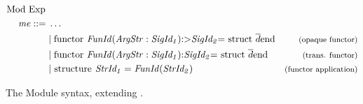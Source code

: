 \begin{figure}[H]
\begin{align*}
\begin{aligned}
%
\text{Mod Exp }\\
\mathit{me} ::= \; & \ldots\\
&|\; \text{\lsttext{functor $\ \cmath{FunId}$($\cmath{ArgStr:SigId_{1}}$):>$\cmath{SigId_{2}}$ = struct $\ \overline{d}$ end}} & \expl{(opaque functor)}\\
&|\; \text{\lsttext{functor $\ \cmath{FunId}$($\cmath{ArgStr:SigId_{1}}$):$\cmath{SigId_{2}}$ = struct $\ \overline{d}$ end}} & \expl{(trans. functor)}\\
&|\; \text{\lsttext{structure}}\ \mathit{StrId_{1} = FunId(StrId_{2})}&\expl{(functor application)}\\
\end{aligned}
\end{align*}
\caption[Extended Module Syntax]{The Module syntax, extending .\label{fig:UpdatedModuleSyntax}}
\end{figure}
